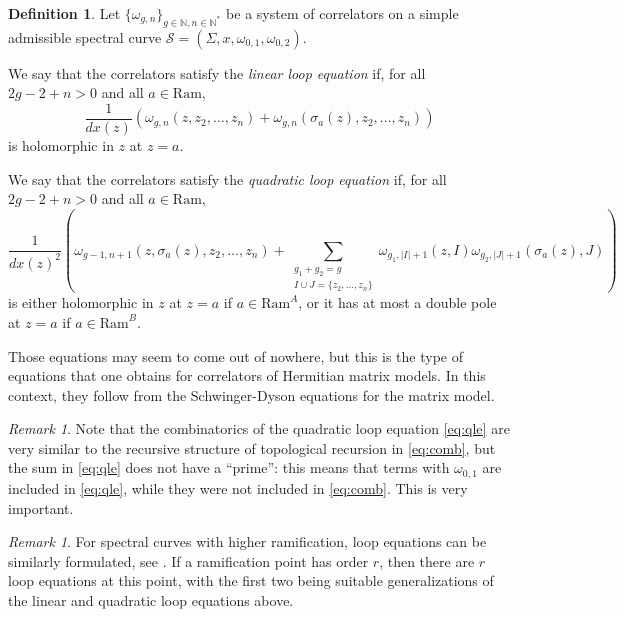 \documentclass[reqno,oneside,11pt]{amsart}
\theoremstyle{plain}
\theoremstyle{definition}
\newtheorem{definition}[theorem]{Definition}
\theoremstyle{remark}
\newtheorem{remark}[theorem]{Remark}
\numberwithin{equation}{section}
\newcommand{\I}{\mathcal{I}}
\newcommand{\Ra}{\text{Ram}}
\begin{document}
\begin{definition}\label{d:loop}
Let $\{\omega_{g,n} \}_{g \in \mathbb{N}, n \in \mathbb{N}^* }$ be a system of correlators on a simple admissible spectral curve $\mathcal{S} = (\Sigma,x,\omega_{0,1}, \omega_{0,2})$. 

We say that the correlators satisfy the \emph{linear loop equation} if, for all $2g-2+n >0$ and all $a \in \Ra$,
\begin{equation}
\frac{1}{dx(z)} \left(\omega_{g,n}(z, z_2, \ldots, z_n) + \omega_{g,n}(\sigma_a(z), z_2, \ldots, z_n) \right)
\end{equation}
is holomorphic in $z$ at $z=a$.

We say that the correlators satisfy the \emph{quadratic loop equation} if, for all $2g-2+n>0$ and all $a \in \Ra$,
\begin{equation}\label{eq:qle}
\frac{1}{dx(z)^2} \left( \omega_{g-1,n+1}(z, \sigma_a(z), z_2, \ldots, z_n) + \sum_{\substack{g_1+g_2=g\\I\cup J = \{ z_2, \ldots, z_n \}}} \omega_{g_1, |I|+1}(z, I) \omega_{g_2,|J|+1}(\sigma_a(z), J) \right)
\end{equation}
is either holomorphic in $z$ at $z=a$ if $a \in \Ra^A$, or it has at most a double pole at $z=a$ if $a \in \Ra^B$.
\end{definition}

Those equations may seem to come out of nowhere, but this is the type of equations that one obtains for correlators of Hermitian matrix models. In this context, they follow from the Schwinger-Dyson equations for the matrix model.

\begin{remark}
Note that the combinatorics of the quadratic loop equation \eqref{eq:qle} are very similar to the recursive structure of topological recursion in \eqref{eq:comb}, but the sum in \eqref{eq:qle} does not have a ``prime'': this means that terms with $\omega_{0,1}$ are included in \eqref{eq:qle}, while they were not included in \eqref{eq:comb}. This is very important.
\end{remark}

\begin{remark}
For spectral curves with higher ramification, loop equations can be similarly formulated, see \cite{BE17,BBCCN18,BKS20,BBCKS23}. If a ramification point has order $r$, then there are $r$ loop equations at this point, with the first two being suitable generalizations of the linear and quadratic loop equations above.
\end{remark}
\end{document}

